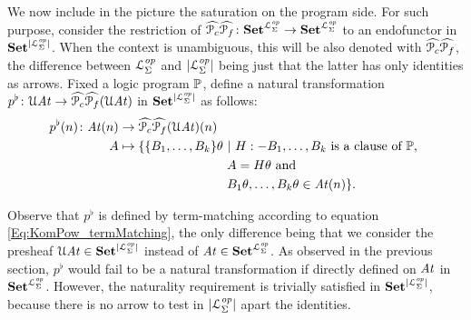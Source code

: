 We now include in the picture the saturation on the program side. For such purpose, consider the restriction of $\widehat{\mathcal P _c}\widehat{\mathcal P _f} \colon \mathbf{Set}^{\mathcal{L}^{\mathit{op}}_{\Sigma}} \to \mathbf{Set}^{\mathcal{L}^{\mathit{op}}_{\Sigma}}$ to an endofunctor in $\mathbf{Set}^{|\mathcal{L}^{\mathit{op}}_{\Sigma}|}$. When the context is unambiguous, this will be also denoted with $\widehat{\mathcal P _c}\widehat{\mathcal P _f}$, the difference between $\mathcal{L}^{\mathit{op}}_{\Sigma}$ and $|\mathcal{L}^{\mathit{op}}_{\Sigma}|$ being just that the latter has only identities as arrows.
Fixed a logic program $\mathbb{P}$, define a natural transformation $p^{\flat} \colon \mathcal{U} \mathit{At} \to \widehat{\mathcal P _c}\widehat{\mathcal P _f} (\mathcal{U} \mathit{At})$ in $\mathbf{Set}^{|\mathcal{L}^{\mathit{op}}_{\Sigma}|}$ as follows:
\begin{align}\label{eq:SatTermMatching}
  p^{\flat}(n) \: \At (n)  &\to \PP (\U \At) (n)  \nonumber \\
                 A            &\mapsto \{ \{B_1,\dots,B_k\}\theta\ |\ H :- B_1,\dots,B_k \text{ is a clause of }\mb{P}\text{, } \nonumber \\
                              & \hspace{3cm} A = H \theta \text{ and } \nonumber\\
                              & \hspace{3cm} B_1\theta, \dots, B_k\theta \in \At(n)\}.
\end{align}

Observe that $p^{\flat}$ is defined by term-matching according to equation \eqref{Eq:KomPow_termMatching}, the only difference being that we consider the presheaf $\mathcal{U}\mathit{At} \in \mathbf{Set}^{|\mathcal{L}^{\mathit{op}}_{\Sigma}|}$ instead of $\mathit{At} \in \mathbf{Set}^{\mathcal{L}^{\mathit{op}}_{\Sigma}}$. As observed in the previous section, $p^{\flat}$ would fail to be a natural transformation if directly defined on $\mathit{At}$ in $\mathbf{Set}^{\mathcal{L}^{\mathit{op}}_{\Sigma}}$. However, the naturality requirement is trivially satisfied in $\mathbf{Set}^{|\mathcal{L}^{\mathit{op}}_{\Sigma}|}$, because there is no arrow to test in $|\mathcal{L}^{\mathit{op}}_{\Sigma}|$ apart the identities.

